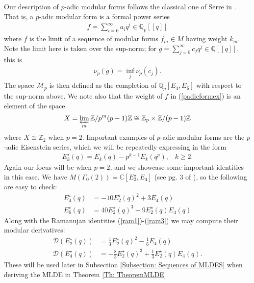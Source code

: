 \documentclass[10pt,a4paper]{amsart}
\numberwithin{equation}{section}
\theoremstyle{definition}
\newcommand{\pmodforms}{\mathcal{M}_{p}}
\begin{document}
Our description of $p$-adic modular forms follows the classical one of Serre in \cite{pSerre}. That is, a $p$-adic modular form is a formal power series
\begin{align}
    f = \sum_{i=0}^{\infty} a_{i}q^{i} \in \mathbb{Q}_{p}[[q]] \label{padicformex}
\end{align}
where $f$ is the limit of a sequence of modular forms $f_{m} \in M$ having weight $k_{m}$. Note the limit here is taken over the sup-norm; for $g = \sum_{j=0}^{\infty} c_{j}q^{j} \in \mathbb{Q}[[q]]$, this is
\begin{align*}
    \nu_{p}(g) = \inf_{j} \nu_{p}(c_{j}).
\end{align*}
The space $\pmodforms$ is then defined as the completion of $\mathbb{Q}_{p}[E_{4},E_{6}]$ with respect to the sup-norm above. We note also that the weight of $f$ in (\ref{padicformex}) is an element of the space
\begin{align*}
    X = \varprojlim_{m} \mathbb{Z}/p^{m}(p-1)\mathbb{Z} \cong \mathbb{Z}_{p} \times \mathbb{Z} / (p-1)\mathbb{Z}
\end{align*}
where $X \cong \mathbb{Z}_{2}$ when $p=2$. Important examples of $p$-adic modular forms are the $p$-adic Eisenstein series, which we will be repeatedly expressing in the form
\begin{align*}
    E_{k}^{\star}(q) = E_{k}(q) - p^{k-1}E_{k}(q^{p}), \hspace{10pt} k \geq 2.
\end{align*}
Again our focus will be when $p=2$, and we showcase some important identities in this case. We have $M(\Gamma_{0}(2)) = \mathbb{C}[E_{2}^{\star}, E_{4}]$ (see pg. 3 of \cite{Gott19}), so the following are easy to check:
\begin{align}
    E_{4}^{\star}(q) &= -10 E_{2}^{\star}(q)^{2} + 3 E_{4}(q) \label{e4starexp} \\
    E_{6}^{\star}(q) &= 40 E_{2}^{\star}(q)^{3} - 9 E_{2}^{\star}(q) E_{4}(q) \label{e6starexp}
\end{align}
Along with the Ramanujan identities (\ref{ram1})-(\ref{ram3}) we may compute their modular derivatives:
\begin{align}
    \mathcal{D} \left( E_{2}^{\star}(q) \right) &= \frac{1}{3} E_{2}^{\star}(q)^{2} - \frac{1}{6} E_{4}(q) \label{e2starder} \\
    \mathcal{D} \left( E_{4}^{\star}(q) \right) &= -\frac{8}{3} E_{2}^{\star}(q)^{3} + \frac{1}{3} E_{2}^{\star}(q) E_{4}(q). \label{e4starder}
\end{align}
These will be used later in Subsection \ref{Subsection: Sequences of MLDES} when deriving the MLDE in Theorem \ref{Th: TheoremMLDE}.
\end{document}
